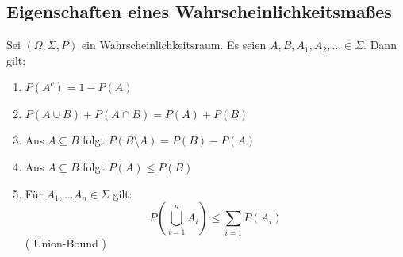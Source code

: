 \subsection{Eigenschaften eines Wahrscheinlichkeitsmaßes}
\begin{proposition}
 Sei $(\Omega,\Sigma,P)$ ein Wahrscheinlichkeitsraum. Es seien $A,B,A_1,A_2, ... \in \Sigma$. Dann gilt:
 \begin{enumerate}
  \item $P(A^c) = 1 - P(A)$
  \item $P( A \cup B ) + P( A \cap B ) = P(A) + P(B)$
  \item Aus $A \subseteq B$ folgt $P(B \setminus A) = P(B) - P(A)$
  \item Aus $A \subseteq B$ folgt $P(A) \leq P(B)$
  \item Für $A_1, ... A_n \in \Sigma$ gilt:
$$ P \left ( \bigcup_{i=1}^n A_i \right ) \leq \sum_{i=1} P(A_i)$$ ( Union-Bound )
 \end{enumerate}
\end{proposition}
